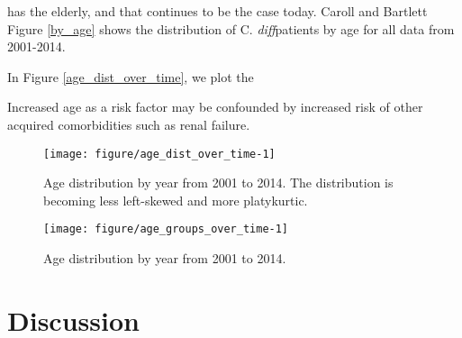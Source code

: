 \documentclass[12pt]{ociamthesis}\usepackage[]{graphicx}\usepackage[]{color}
\makeatletter
\def\maxwidth{ %
  \ifdim\Gin@nat@width>\linewidth
    \linewidth
  \else
    \Gin@nat@width
  \fi
}
\newenvironment{kframe}{%
 \def\at@end@of@kframe{}%
 \ifinner\ifhmode%
  \def\at@end@of@kframe{\end{minipage}}%
  \begin{minipage}{\columnwidth}%
 \fi\fi%
 \def\FrameCommand##1{\hskip\@totalleftmargin \hskip-\fboxsep
 \colorbox{shadecolor}{##1}\hskip-\fboxsep
     \hskip-\linewidth \hskip-\@totalleftmargin \hskip\columnwidth}%
 \MakeFramed {\advance\hsize-\width
   \@totalleftmargin\z@ \linewidth\hsize
   \@setminipage}}%
 {\par\unskip\endMakeFramed%
 \at@end@of@kframe}
\newenvironment{knitrout}{}{} %
\newcommand{\cdiff}{C. \textit{diff}}
\makeatother
\begin{document}
has  the elderly, and that continues to be the case today. Caroll and Bartlett \cite{Carroll2011}
Figure \ref{by_age} shows the distribution of \cdiff patients by age for all data from 2001-2014. 
\cite{Masgala2014}


In Figure \ref{age_dist_over_time}, we plot the



Increased age as a risk factor may be confounded by increased risk of other acquired comorbidities such as renal failure. 
\cite{Krapohl2013} \cite{Masgala2014}



\begin{knitrout}
\color{fgcolor}\begin{figure}

{\centering \texttt{[image: figure/age\_dist\_over\_time-1]} 

}

\caption[Age distribution by year from 2001 to 2014]{Age distribution by year from 2001 to 2014. The distribution is becoming less left-skewed and more platykurtic.}\label{fig:age_dist_over_time}
\end{figure}


\end{knitrout}


\begin{knitrout}
\color{fgcolor}\begin{kframe}


{\ttfamily\noindent\itshape\color{messagecolor}{\#\# Don't know how to automatically pick scale for object of type ts. Defaulting to continuous.}}\end{kframe}\begin{figure}

{\centering \texttt{[image: figure/age\_groups\_over\_time-1]} 

}

\caption[Age distribution by year from 2001 to 2014]{Age distribution by year from 2001 to 2014. }\label{fig:age_groups_over_time}
\end{figure}


\end{knitrout}

\chapter{Discussion}
\end{document}
